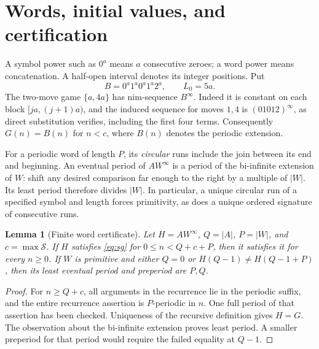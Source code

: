 \documentclass[11pt]{article}
\newtheorem{lemma}[theorem]{Lemma}
\theoremstyle{remark}\newtheorem{remark}[theorem]{Remark}
\newcommand{\per}{^{\infty}}
\newcommand{\half}[2]{[#1,#2)}
\begin{document}
\section{Words, initial values, and certification}
A symbol power such as $0^a$ means $a$ consecutive zeroes; a word power means concatenation. A half-open interval denotes its integer positions. Put
\begin{equation}\label{eq:B}
 B=0^a1^a0^a1^a2^a,\qquad L_0=5a.
\end{equation}
The two-move game $\{a,4a\}$ has nim-sequence $B\per$. Indeed it is constant on each block $\half{ja}{(j+1)a}$, and the induced sequence for moves $1,4$ is $(01012)\per$, as direct substitution verifies, including the first four terms. Consequently $G(n)=B(n)$ for $n<c$, where $B(n)$ denotes the periodic extension.

For a periodic word of length $P$, its \emph{circular} runs include the join between its end and beginning. An eventual period of $AW\per$ is a period of the bi-infinite extension of $W$: shift any desired comparison far enough to the right by a multiple of $|W|$. Its least period therefore divides $|W|$. In particular, a unique circular run of a specified symbol and length forces primitivity, as does a unique ordered signature of consecutive runs.

\begin{lemma}[Finite word certificate]\label{lem:certificate}
Let $H=AW\per$, $Q=|A|$, $P=|W|$, and $c=\max\mathcal S$. If $H$ satisfies \eqref{eq:sg} for $0\le n<Q+c+P$, then it satisfies it for every $n\ge0$. If $W$ is primitive and either $Q=0$ or $H(Q-1)\ne H(Q-1+P)$, then its least eventual period and preperiod are $P,Q$.
\end{lemma}
\begin{proof}
For $n\ge Q+c$, all arguments in the recurrence lie in the periodic suffix, and the entire recurrence assertion is $P$-periodic in $n$. One full period of that assertion has been checked. Uniqueness of the recursive definition gives $H=G$. The observation about the bi-infinite extension proves least period. A smaller preperiod for that period would require the failed equality at $Q-1$.
\end{proof}
\end{document}
